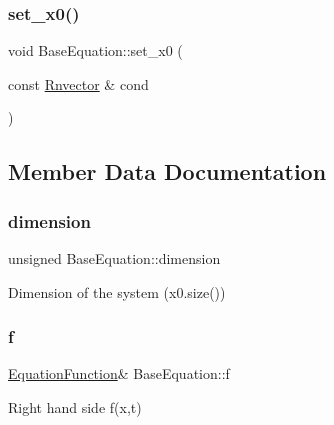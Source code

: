\subsubsection{\texorpdfstring{set\+\_\+x0()}{set\_x0()}}
{\footnotesize\ttfamily void Base\+Equation\+::set\+\_\+x0 (\begin{DoxyParamCaption}\item[{const \hyperlink{utils_8hpp_a8e0cccfe9e5cee5140bfcfbd9a3a6a0e}{Rnvector} \&}]{cond }\end{DoxyParamCaption})\hspace{0.3cm}{\ttfamily [inline]}}



\subsection{Member Data Documentation}
\mbox{\label{classBaseEquation_ad57b2ae84acedfb6d38b70e08dc39db3}} 
\subsubsection{\texorpdfstring{dimension}{dimension}}
{\footnotesize\ttfamily unsigned Base\+Equation\+::dimension\hspace{0.3cm}{\ttfamily [private]}}



Dimension of the system (x0.\+size()) 

\mbox{\label{classBaseEquation_ae7bf8243e94cd4cd762345048849a967}} 
\subsubsection{\texorpdfstring{f}{f}}
{\footnotesize\ttfamily \hyperlink{structEquationFunction}{Equation\+Function}\& Base\+Equation\+::f\hspace{0.3cm}{\ttfamily [private]}}



Right hand side f(x,t) 

\mbox{\label{classBaseEquation_a5286836cab7d0366681863c8cda0d45b}} 

